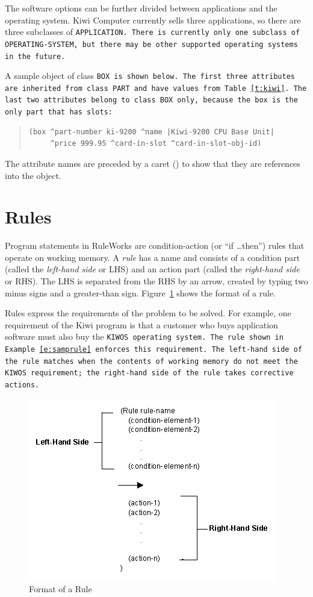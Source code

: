 The software options can be further divided between applications and
the operating system. Kiwi Computer currently sells three
applications, so there are three subclasses of \tt{APPLICATION}. There
is currently only one subclass of \tt{OPERATING-SYSTEM}, but there may
be other supported operating systems in the future.

A sample object of class \tt{BOX} is shown below.  The first three
attributes are inherited from class \tt{PART} and have values from
Table~\ref{t:kiwi}. The last two attributes belong to class \tt{BOX}
only, because the box is the only part that has slots:

\begin{quote}
\begin{verbatim}
(box ^part-number ki-9200 ^name |Kiwi-9200 CPU Base Unit| 
     ^price 999.95 ^card-in-slot ^card-in-slot-obj-id)
\end{verbatim}
\end{quote}

The attribute names are preceded by a caret (\ct) to show that they
are references into the object.

\section{Rules}

Program statements in RuleWorks are condition-action (or ``if
\ldots{}then'') rules that operate on working memory. A \emph{rule}
has a name and consists of a condition part (called the
\emph{left-hand side} or LHS) and an action part (called the
\emph{right-hand side} or RHS). The LHS is separated from the RHS by
an arrow, created by typing two minus signs and a greater-than
sign. Figure~\ref{f:1-2} shows the format of a rule.

Rules express the requirements of the problem to be solved. For
example, one requirement of the Kiwi program is that a customer who
buys application software must also buy the \tt{KIWOS} operating
system. The rule shown in Example~\ref{e:samprule} enforces this
requirement. The left-hand side of the rule matches when the contents
of working memory do not meet the \tt{KIWOS} requirement; the
right-hand side of the rule takes corrective actions.

\begin{figure}[h]
  \centering
  \includegraphics[scale=0.7]{f1-2}
  \caption{Format of a Rule}
  \label{f:1-2}
\end{figure}

